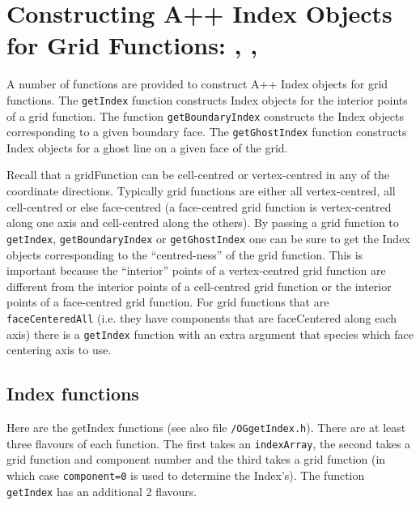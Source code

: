 \section{Constructing A++ Index Objects for Grid Functions: 
   , , } 
\label{getIndex}


A number of functions are provided to construct A++ Index 
objects for grid functions. The {\tt getIndex} function
constructs Index objects for the interior points
of a grid function. The function {\tt getBoundaryIndex}
constructs the Index objects corresponding to a
given boundary face. The {\tt getGhostIndex} function
constructs Index objects for a ghost line on a given
face of the grid. 

Recall that a gridFunction can be cell-centred
or vertex-centred in any of the coordinate
directions. Typically grid functions are either
all vertex-centred, all cell-centred or
else face-centred (a face-centred grid function
is vertex-centred along one axis and cell-centred
along the others).
By passing a grid function to {\tt getIndex}, 
{\tt getBoundaryIndex} or {\tt getGhostIndex} one
can be sure to get the Index objects corresponding 
to the ``centred-ness'' of the grid function.
This is important because the ``interior'' points
of a vertex-centred grid function are different
from the interior
points of a cell-centred grid function or the
interior points of a face-centred grid function.
For grid functions that are {\tt faceCenteredAll} (i.e. they have components
that are faceCentered along each axis) there is a {\tt getIndex} function
with an extra argument that species which face centering axis to use.


\subsection{Index functions}

Here are the getIndex functions (see also file {\tt \gf/OGgetIndex.h}).
There are at least three flavours of each function. The first takes an {\tt indexArray},
the second takes a grid function and component number and the third takes
a grid function (in which case {\tt component=0} is used to determine
the Index's). The function {\tt getIndex} has an additional 2 flavours.


